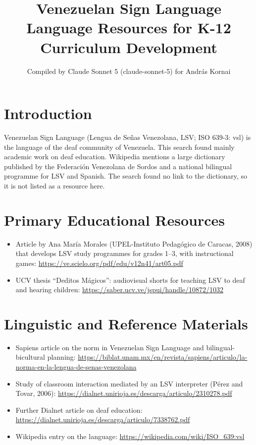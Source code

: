 \documentclass[12pt]{article}
\title{Venezuelan Sign Language Language Resources for K-12 Curriculum Development}
\author{Compiled by Claude Sonnet 5 (claude-sonnet-5) for Andr\'as Kornai}
\date{}
\begin{document}
\maketitle

\section{Introduction}
Venezuelan Sign Language (Lengua de Se\~nas Venezolana, LSV; ISO 639-3: vsl) is the language of the deaf community of Venezuela. This search found mainly academic work on deaf education. Wikipedia mentions a large dictionary published by the Federaci\'on Venezolana de Sordos and a national bilingual programme for LSV and Spanish. The search found no link to the dictionary, so it is not listed as a resource here.

\section{Primary Educational Resources}
\begin{itemize}
\item Article by Ana Mar\'ia Morales (UPEL-Instituto Pedag\'ogico de Caracas, 2008) that develops LSV study programmes for grades 1--3, with instructional games: \url{https://ve.scielo.org/pdf/edu/v12n41/art05.pdf}
\item UCV thesis ``Deditos M\'agicos'': audiovisual shorts for teaching LSV to deaf and hearing children: \url{https://saber.ucv.ve/jspui/handle/10872/1032}
\end{itemize}

\section{Linguistic and Reference Materials}
\begin{itemize}
\item Sapiens article on the norm in Venezuelan Sign Language and bilingual-bicultural planning: \url{https://biblat.unam.mx/en/revista/sapiens/articulo/la-norma-en-la-lengua-de-senas-venezolana}
\item Study of classroom interaction mediated by an LSV interpreter (P\'erez and Tovar, 2006): \url{https://dialnet.unirioja.es/descarga/articulo/2310278.pdf}
\item Further Dialnet article on deaf education: \url{https://dialnet.unirioja.es/descarga/articulo/7338762.pdf}
\item Wikipedia entry on the language: \url{https://wikipedia.com/wiki/ISO_639:vsl}
\end{itemize}
\end{document}
